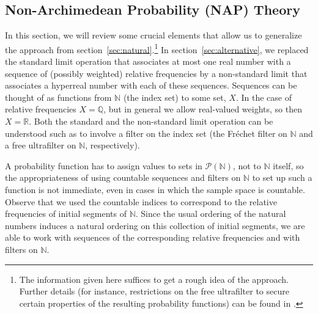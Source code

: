 \subsection{Non-Archimedean Probability (NAP) Theory}\label{sec:NAP}
In this section, we will review some crucial elements that allow us to generalize the approach from section~\ref{sec:natural}.\footnote{The information given here suffices to get a rough idea of the approach. Further details (for instance, restrictions on the free ultrafilter to secure certain properties of the resulting probability functions) can be found in \citet{Benci_etal:2013}.}
In section~\ref{sec:alternative}, we replaced the standard limit operation that associates at most one real number with a sequence of (possibly weighted) relative frequencies by a non-standard limit that associates a hyperreal number with each of these sequences.
Sequences can be thought of as functions from $\mathbb{N}$ (the index set) to some set, $X$. In the case of relative frequencies $X=\mathbb{Q}$, but in general we allow real-valued weights, so then $X=\mathbb{R}$.
Both the standard and the non-standard limit operation can be understood such as to involve a filter on the index set (the Fr{\'e}chet filter on $\mathbb{N}$ and a free ultrafilter on $\mathbb{N}$, respectively).

A probability function has to assign values to sets in $\mathcal{P}(\mathbb{N})$, not to $\mathbb{N}$ itself, so the appropriateness of using countable sequences and filters on $\mathbb{N}$ to set up such a function is not immediate, even in cases in which the sample space is countable. Observe that we used the countable indices to correspond to the relative frequencies of initial segments of $\mathbb{N}$. Since the usual ordering of the natural numbers induces a natural ordering on this collection of initial segments, we are able to work with sequences of the corresponding relative frequencies and with filters on $\mathbb{N}$.

